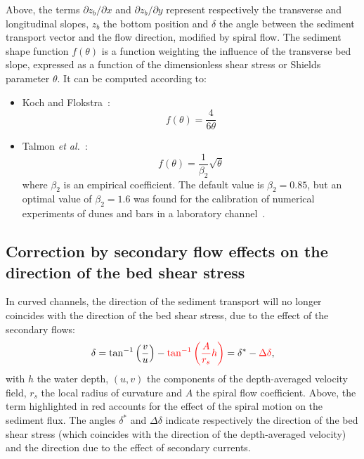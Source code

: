 Above, the terms $\partial z_b/\partial x$ and $\partial z_b/\partial y$ represent respectively the transverse and longitudinal slopes, $z_b$ the bottom position and $\delta$ the angle between the sediment transport vector and the flow direction, modified by spiral flow. The sediment shape function $f(\theta)$ is a function weighting the influence of the transverse bed slope, expressed as a function of the dimensionless shear stress or Shields parameter $\theta$. It can be computed according to:

\begin{itemize}
\item Koch and Flokstra~\cite{KochFlokstra80}:
\begin{equation*}
f(\theta) = \frac{4}{6\theta}
\end{equation*}
\item Talmon \textit{et al.}~\cite{Talmon95}:
\begin{equation*}
f(\theta) = \frac{1}{\beta_2}\sqrt{\theta}
\end{equation*}
where $\beta_2$ is an empirical coefficient. The default value is $\beta_2=0.85$, but an optimal value of $\beta_2=1.6$ was found for the calibration of numerical experiments of dunes and bars in a laboratory channel~\cite{Mendoza15}.
\end{itemize}

\subsection{Correction by secondary flow effects on the direction of the bed shear stress}
In curved channels, the direction of the sediment transport will no longer coincides with the direction of the bed shear stress,
due to the effect of the secondary flows:
\begin{equation}\label{eq:delta}
\delta = \tan^{-1}\left(\frac{v}{u}\right) - \textcolor{red}{\tan^{-1}\left(\frac{A}{r_s}h\right)} = \delta^* - \textcolor{red}{\Delta\delta},
\end{equation}
with $h$ the water depth, $(u,v)$ the components of the depth-averaged velocity field, $r_s$ the local radius of curvature and $A$ the spiral flow coefficient. Above, the term highlighted in red accounts for the effect of the spiral motion on the sediment flux. The angles $\delta^*$ and $\Delta\delta$ indicate respectively the direction of the bed shear stress (which coincides with the direction of the depth-averaged velocity) and the direction due to the effect of secondary currents.

